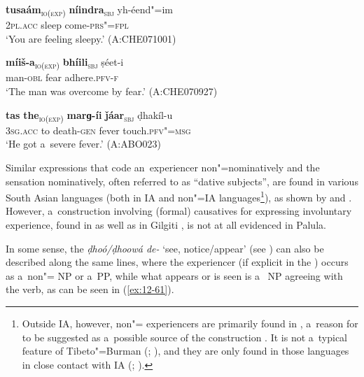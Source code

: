 \begin{exe}
\ex
\label{ex:12-58}
\gll {\ob}\textbf{tusaám}{\cb}\textsubscript{\textsc{\upshape io(exp)}} {\ob}\textbf{níindra}{\cb}\textsubscript{\textsc{\upshape sbj}} yh-éend"=im \\
\textsc{2pl.acc} sleep come-\textsc{prs"=fpl} \\
\glt `You are feeling sleepy.' (A:CHE071001)

\ex
\label{ex:12-59}
\gll {\ob}\textbf{míiš-a}{\cb}\textsubscript{\textsc{\upshape io(exp)}} {\ob}\textbf{bhíili}{\cb}\textsubscript{\textsc{\upshape sbj}}
ṣéet-i \\
man-\textsc{obl} fear adhere.\textsc{pfv-f} \\
\glt `The man was overcome by fear.' (A:CHE070927)

\ex
\label{ex:12-60}
\gll {\ob}\textbf{tas} \textbf{the}{\cb}\textsubscript{\textsc{\upshape io(exp)}} {\ob}\textbf{marɡ-íi} \textbf{ǰáar}{\cb}\textsubscript{\textsc{\upshape sbj}} ḍhakíl-u \\
3\textsc{sg.acc} to death-\textsc{gen} fever touch.\textsc{pfv"=msg} \\
\glt `He got a~severe fever.' (A:ABO023)
\end{exe}

Similar expressions that code an~experiencer non"=nominatively and the sensation nominatively, often referred to as ``dative subjects'', are found in various South Asian languages (both in IA and non"=IA languages\footnote{Outside IA, however, non"= experiencers are primarily found in \iliDravidian \citep[260--263]{abbi1990}, a~reason for \iliDravidian to be suggested as a~possible source of the construction \citep[136]{hock1990}. It is not a~typical feature of Tibeto"=Burman (\citealt[260]{abbi1990}; \citealt[82]{bickel2004}), and they are only found in those \iliTibetan languages in close contact with IA (\citealt[83, 88]{bickel2004}; \citealt[8--9]{noonan2003}).}), as shown by \citet[326--330]{hook1990b} and \citet[256--263]{abbi1990}. However, a~construction involving (formal) causatives for expressing involuntary experience, found in \iliKalasha \citep[310]{bashir1990} as well as in Gilgiti \iliShina \citep{hookzia2005}, is not at all evidenced in Palula. 



In some sense, the  \textit{ḍhoó/ḍhoowá de-} `see, notice/appear' (see ) can also be described along the same lines, where the experiencer (if explicit in the ) occurs as a~non"= NP or a~PP, while what appears or is seen is a~ NP agreeing with the verb, as can be seen in (\ref{ex:12-61}).

